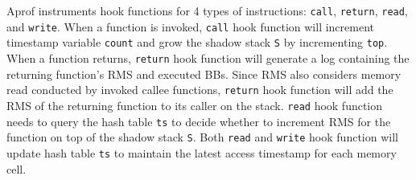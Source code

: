 Aprof instruments hook functions for 4 types of instructions: 
\texttt{call}, \texttt{return}, \texttt{read}, and \texttt{write}. 
When a function is invoked, 
\texttt{call} hook function will increment timestamp variable \texttt{count}
and grow the shadow stack \texttt{S} by incrementing \texttt{top}.
When a function returns,
\texttt{return} hook function will 
generate a log 
containing the returning function's RMS and executed BBs.
Since RMS also considers memory read conducted by 
invoked callee functions, 
\texttt{return} hook function will add 
the RMS of the returning function to its caller on the stack. 
\texttt{read} hook function needs to query the hash table \texttt{ts} to decide  
whether to increment RMS for the function on top of the shadow stack \texttt{S}.
Both \texttt{read} and \texttt{write} 
hook function will update hash table \texttt{ts}
to maintain the latest access timestamp for each memory cell. 



